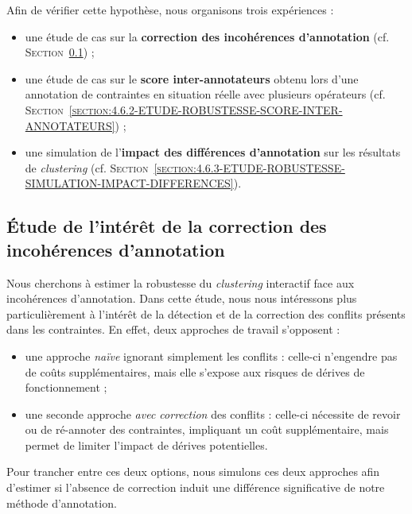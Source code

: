 	Afin de vérifier cette hypothèse, nous organisons trois expériences :
	\begin{itemize}
		\item une étude de cas sur la \textbf{correction des incohérences d'annotation} (cf. \textsc{Section~\ref{section:4.6.1-ETUDE-ROBUSTESSE-INTERET-CORRECTION-INCOHERENCES}}) ;
		\item une étude de cas sur le \textbf{score inter-annotateurs} obtenu lors d'une annotation de contraintes en situation réelle avec plusieurs opérateurs (cf. \textsc{Section~\ref{section:4.6.2-ETUDE-ROBUSTESSE-SCORE-INTER-ANNOTATEURS}}) ;
		\item une simulation de l'\textbf{impact des différences d'annotation} sur les résultats de \textit{clustering} (cf. \textsc{Section~\ref{section:4.6.3-ETUDE-ROBUSTESSE-SIMULATION-IMPACT-DIFFERENCES}}).
	\end{itemize}
	
	
	\subsection{Étude de l'intérêt de la correction des incohérences d'annotation}
	\label{section:4.6.1-ETUDE-ROBUSTESSE-INTERET-CORRECTION-INCOHERENCES}
		
		Nous cherchons à estimer la robustesse du \textit{clustering} interactif face aux incohérences d'annotation.
		Dans cette étude, nous nous intéressons plus particulièrement à l'intérêt de la détection et de la correction des conflits présents dans les contraintes.
		En effet, deux approches de travail s'opposent :
		\begin{itemize}
			\item une approche \textit{naïve} ignorant simplement les conflits : celle-ci n'engendre pas de coûts supplémentaires, mais elle s'expose aux risques de dérives de fonctionnement ;
			\item une seconde approche \textit{avec correction} des conflits : celle-ci nécessite de revoir ou de ré-annoter des contraintes, impliquant un coût supplémentaire, mais permet de limiter l'impact de dérives potentielles.
		\end{itemize}
		Pour trancher entre ces deux options, nous simulons ces deux approches afin d'estimer si l'absence de correction induit une différence significative de notre méthode d'annotation.
	
